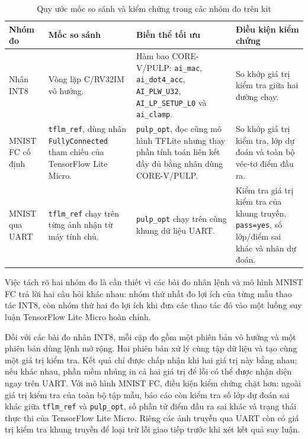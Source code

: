 \documentclass[../DoAn.tex]{subfiles}
\begin{document}
\begin{table}[H]
    \centering
    \footnotesize
    \setlength{\tabcolsep}{3pt}
    \renewcommand{\arraystretch}{1.15}
    \begin{tabular}{|>{\raggedright\arraybackslash}p{2.05cm}|>{\raggedright\arraybackslash}p{3.35cm}|>{\raggedright\arraybackslash}p{4.70cm}|>{\raggedright\arraybackslash}p{2.55cm}|}
        \hline
        \textbf{Nhóm đo} & \textbf{Mốc so sánh} & \textbf{Biến thể tối ưu} & \textbf{Điều kiện kiểm chứng} \\
        \hline
        Nhân INT8 & Vòng lặp C/RV32IM vô hướng. & Hàm bao CORE-V/PULP: \texttt{ai\_mac}, \texttt{ai\_dot4\_acc}, \texttt{AI\_PLW\_U32}, \texttt{AI\_LP\_SETUP\_L0} và \texttt{ai\_clamp}. & So khớp giá trị kiểm tra giữa hai đường chạy. \\
        \hline
        MNIST FC cố định & \texttt{tflm\_ref}, dùng nhân \texttt{FullyConnected} tham chiếu của TensorFlow Lite Micro. & \texttt{pulp\_opt}, đọc cùng mô hình TFLite nhưng thay phần tính toán liên kết đầy đủ bằng nhân dùng CORE-V/PULP. & So khớp giá trị kiểm tra, lớp dự đoán và toàn bộ véc-tơ điểm đầu ra. \\
        \hline
        MNIST qua UART & \texttt{tflm\_ref} chạy trên từng ảnh nhận từ máy tính chủ. & \texttt{pulp\_opt} chạy trên cùng khung dữ liệu UART. & Kiểm tra giá trị kiểm tra của khung truyền, \texttt{pass=yes}, số lớp/điểm sai khác và nhãn dự đoán. \\
        \hline
    \end{tabular}
    \caption{Quy ước mốc so sánh và kiểm chứng trong các nhóm đo trên kit}
    \label{tab:board-measurement-baselines}
\end{table}

Việc tách rõ hai nhóm đo là cần thiết vì các bài đo nhân lệnh và mô hình MNIST FC trả lời hai câu hỏi khác nhau: nhóm thứ nhất đo lợi ích của từng mẫu thao tác INT8, còn nhóm thứ hai đo lợi ích khi đưa các thao tác đó vào một luồng suy luận TensorFlow Lite Micro hoàn chỉnh.

Đối với các bài đo nhân INT8, mỗi cặp đo gồm một phiên bản vô hướng và một phiên bản dùng lệnh mở rộng. Hai phiên bản xử lý cùng tập dữ liệu và tạo cùng một giá trị kiểm tra. Kết quả chỉ được chấp nhận khi hai giá trị này bằng nhau; nếu khác nhau, phần mềm nhúng in cả hai giá trị để lỗi có thể được nhận diện ngay trên UART. Với mô hình MNIST FC, điều kiện kiểm chứng chặt hơn: ngoài giá trị kiểm tra của toàn bộ tập mẫu, báo cáo còn kiểm tra số lớp dự đoán sai khác giữa \texttt{tflm\_ref} và \texttt{pulp\_opt}, số phần tử điểm đầu ra sai khác và trạng thái thực thi của TensorFlow Lite Micro. Riêng các ảnh truyền qua UART còn có giá trị kiểm tra khung truyền để loại trừ lỗi giao tiếp trước khi xét kết quả suy luận.
\end{document}
